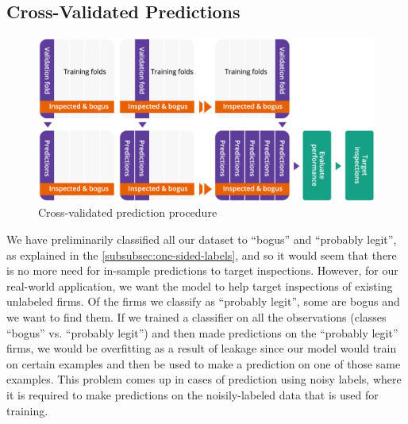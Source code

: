 \subsection{Cross-Validated Predictions}
\label{subsec:cvp}
\begin{figure}
  \includegraphics[width=1\columnwidth]{graphs/CrossValidatedPrediction.png}
  \caption{Cross-validated prediction procedure}
  \label{fig:crossvalidation}
\end{figure}

We have preliminarily classified all our dataset to ``bogus'' and ``probably legit'', as explained in the \cref{subsubsec:one-sided-labels}, and so it would seem that there is no more need for in-sample predictions to target inspections. However, for our real-world application, we want the model to help target inspections of existing unlabeled firms. Of the firms we classify as ``probably legit'', some are bogus and we want to find them. If we trained a classifier on all the observations (classes ``bogus'' vs. ``probably legit'') and then made predictions on the ``probably legit'' firms, we would be overfitting as a result of leakage since our model would train on certain examples and then be used to make a prediction on one of those same examples. This problem comes up in cases of prediction using noisy labels, where it is required to make predictions on the noisily-labeled data that is used for training.

